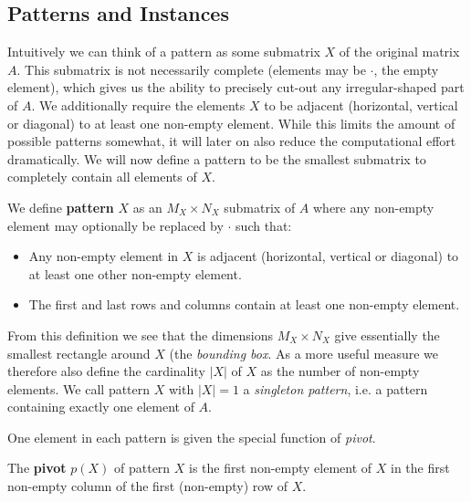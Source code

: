 \documentclass[a4paper,notoc,oneside]{tufte-book}
\begin{document}
\subsection{Patterns and Instances}
Intuitively we can think of a pattern as some submatrix $X$ of the original matrix $A$. This submatrix is not necessarily complete (elements may be $\cdot$, the empty element), which gives us the ability to precisely cut-out any irregular-shaped part of $A$. We additionally require the elements $X$ to be adjacent (horizontal, vertical or diagonal) to at least one non-empty element. While this limits the amount of possible patterns somewhat, it will later on also reduce the computational effort dramatically. We will now define a pattern to be the smallest submatrix to completely contain all elements of $X$.

\begin{definition}
We define \textbf{pattern} $X$ as an $M_X\times N_X$ submatrix of $A$ where any non-empty element may optionally be replaced by $\cdot$ such that:
\begin{itemize}
\item Any non-empty element in $X$ is adjacent (horizontal, vertical or diagonal) to at least one other non-empty element.
\item The first and last rows and columns contain at least one non-empty element.
\end{itemize}
\end{definition}

From this definition we see that the dimensions $M_X\times N_X$ give essentially the smallest rectangle around $X$ (the \emph{bounding box}. As a more useful measure we therefore also define the cardinality $|X|$ of $X$ as the number of non-empty elements. We call pattern $X$ with $|X|=1$ a \emph{singleton pattern}, i.e. a pattern containing exactly one element of $A$. 

One element in each pattern is given the special function of \emph{pivot}. 

\begin{definition}
The \textbf{pivot} $p(X)$ of pattern $X$ is the first non-empty element of $X$ in the first non-empty column of the first (non-empty) row of $X$.
\end{definition}
\end{document}

